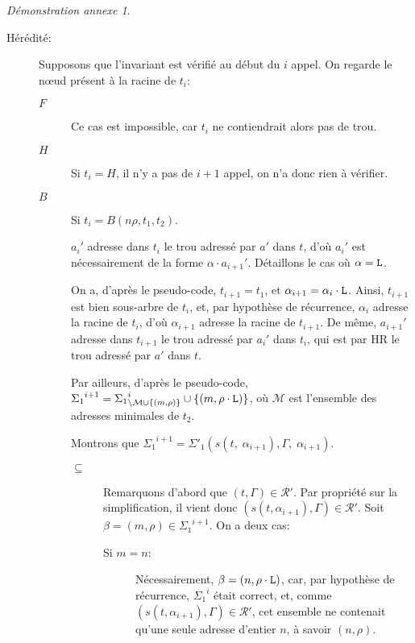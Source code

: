 \documentclass[11pt,a4paper]{article}
\theoremstyle{plain}
\theoremstyle{definition}
\theoremstyle{remark}
\newtheorem{demonstrationappendix}{Démonstration annexe}
\newcommand*{\someadd}{\rho}
\newcommand*{\sequent}{\Gamma}
\newcommand*{\Left}{\textnormal{\texttt{L}}}
\newcommand*{\representationspartial}{\ensuremath{\mathcal{R'}}}
\newcommand*{\highapprox}{\ensuremath{\Sigma_1}}
\newcommand*{\highapproxspec}{\ensuremath{\Sigma'_1}}
\newcommand*{\treesimplify}{\ensuremath{s}}
\begin{document}
\begin{demonstrationappendix}
\begin{description}
        \item[Hérédité:] Supposons que l'invariant est vérifié au début du $i$\ieme{} appel. On regarde le n\oe ud présent à la racine de $t_i$:

        \begin{description}
            \item[$F$]
                Ce cas est impossible, car $t_i$ ne contiendrait alors pas de trou.
                
            \item[$H$]
                Si $t_i = H$, il n'y a pas de $i+1$\ieme{} appel, on n'a donc rien à vérifier. 

            \item[$B$] Si $t_i = B(n\rho, t_1, t_2)$.

            $a_i'$ adresse dans $t_i$ le trou adressé par $a'$ dans $t$, d'où $a_i'$ est nécessairement de la forme $\alpha \cdot a_{i+1}'$. Détaillons le cas où $\alpha = \Left$.

            On a, d'après le pseudo-code, $t_{i+1} = t_1$, et $\alpha_{i+1} = \alpha_i \cdot \Left$. Ainsi, $t_{i+1}$ est bien sous-arbre de $t_i$, et, par hypothèse de récurrence, $\alpha_i$ adresse la racine de $t_i$, d'où $\alpha_{i+1}$ adresse la racine de $t_{i+1}$. De même, $a_{i+1}'$ adresse dans $t_{i+1}$ le trou adressé par $a_i'$ dans $t_i$, qui est par HR le trou adressé par $a'$ dans $t$.
            
            Par ailleurs, d'après le pseudo-code, ${\highapprox}^{i+1} = {\highapprox}^{i}_{\setminus \mathcal{M} \cup \{ (m, \someadd) \}} \cup \left\{ (m, \someadd \cdot \Left) \right\}$, où $\mathcal{M}$ est l'ensemble des adresses minimales de $t_2$.

            Montrons que ${\highapprox}^{i+1} = \highapproxspec \left( \treesimplify( t, \; {\alpha}_{i+1} ), \sequent, \; {\alpha}_{i+1} \right)$.

            \begin{description}
                \item[$\subseteq$] 
                    Remarquons d'abord que $(t, \sequent) \in \representationspartial$. Par propriété sur la simplification, il vient donc $(s(t, \alpha_{i+1}), \sequent) \in \representationspartial$. Soit $\beta = (m, \someadd) \in {\highapprox}^{i+1}$. On a deux cas:

                    \begin{description}
                        \item[Si $m = n$:] 
                            Nécessairement, $\beta = (n, \rho \cdot \Left)$, car, par hypothèse de récurrence, ${\highapprox}^{i}$ était correct, et, comme $(s(t, \alpha_{i+1}), \sequent) \in \representationspartial$, cet ensemble ne contenait qu'une seule adresse d'entier $n$, à savoir $(n, \rho)$.
                            

\end{description}
\end{description}
\end{description}
\end{description}
\end{demonstrationappendix}
\end{document}
